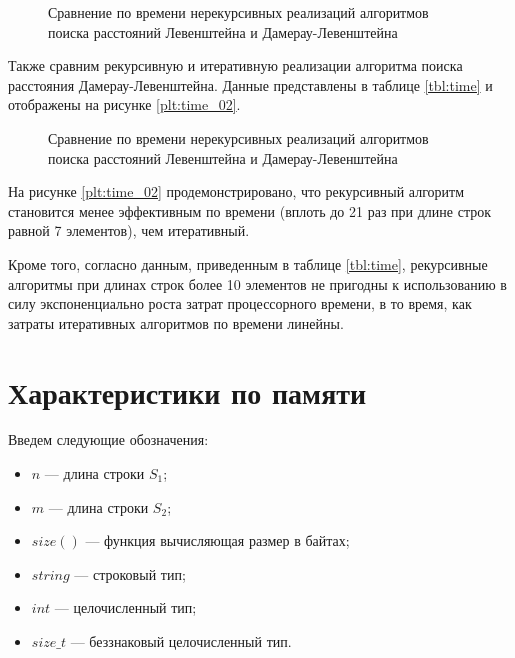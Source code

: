 \begin{figure}[h]
	\centering
	
	\caption{Сравнение по времени нерекурсивных реализаций алгоритмов поиска расстояний Левенштейна и Дамерау-Левенштейна}
	\label{plt:time_matrix_cmp}
\end{figure}

Также сравним рекурсивную и итеративную реализации алгоритма поиска расстояния Дамерау-Левенштейна. Данные представлены в таблице \ref{tbl:time} и отображены на рисунке \ref{plt:time_02}.



\begin{figure}[h]
	\centering
	
	\caption{Сравнение по времени нерекурсивных реализаций алгоритмов поиска расстояний Левенштейна и Дамерау-Левенштейна}
	\label{plt:time_rec_cmp}
\end{figure}

На рисунке \ref{plt:time_02} продемонстрировано, что рекурсивный алгоритм становится менее эффективным по времени (вплоть до 21 раз при длине строк равной 7 элементов), чем итеративный.

Кроме того, согласно данным, приведенным в таблице \ref{tbl:time}, рекурсивные алгоритмы при длинах строк более 10 элементов не пригодны к использованию в силу экспоненциально роста затрат процессорного времени, в то время, как затраты итеративных алгоритмов по времени линейны.

\section{Характеристики по памяти}

Введем следующие обозначения:
\begin{itemize}
	\item$n$ --- длина строки $S_{1}$;
	\item$m$ --- длина строки $S_{2}$;
	\item$size()$ --- функция вычисляющая размер в байтах;
	\item $string$ --- строковый тип;
	\item $int$ --- целочисленный тип;
	\item $size\_t$ --- беззнаковый целочисленный тип.
\end{itemize}

